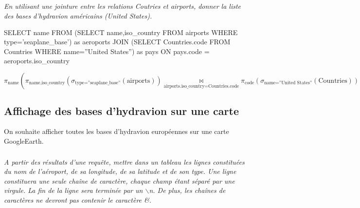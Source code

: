 \documentclass[10pt,fleqn]{article} %
\begin{document}
\subparagraph{}
\textit{En utilisant une jointure entre les relations Coutries et airports, donner la liste des bases d'hydravion américains (United States). }

\ifprof
\begin{corrige}
\begin{envsql}
\begin{sql}
SELECT name FROM 
	(SELECT name,iso_country FROM airports WHERE type='seaplane_base') as aeroports
	JOIN
	(SELECT Countries.code FROM Countries WHERE name=''United States'') as pays 
	ON pays.code = aeroports.iso_country
\end{sql}
\end{envsql}
$$
\pi_{\text{name}}\left(
	\pi_{\text{name,iso\_country}} \left(
		\sigma_{\text{type=''seaplane\_base''}}\left( \text{airports}\right)\right)
	\underset{\text{airports.iso\_country}=\text{Countries.code}}{\bowtie }		
	\pi_{\text{code}} \left(
		\sigma_{\text{name=''United States''}}\left( \text{Countries}\right)\right)\right)
$$
\end{corrige}\else
\fi

\subsection*{Affichage des bases d'hydravion sur une carte}
On souhaite afficher toutes les bases d'hydravion européennes sur une carte GoogleEarth. 


\subparagraph{}
\textit{A partir des résultats d'une requête, mettre dans un tableau les lignes constituées du nom de l'aéroport, de sa longitude, de sa latitude et de son type. Une ligne constituera une seule chaîne de caractère, chaque champ étant séparé par une virgule. La fin de la ligne sera terminée par un $\backslash$n. De plus, les chaînes de caractères ne devront pas contenir le caractère \&.}

\ifprof
\begin{corrige}
\end{corrige}
\else
\fi

\end{document}
